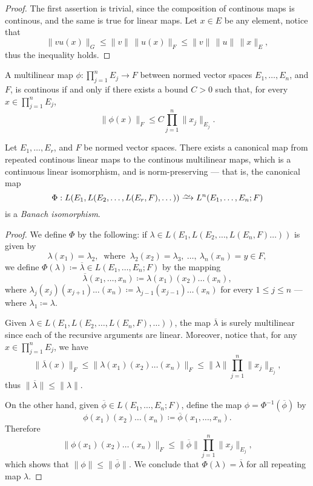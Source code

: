 \begin{proof}
The first assertion is trivial, since the composition of continous maps is
continous, and the same is true for linear maps. Let \(x \in E\) be any element,
notice that
\[
  \|vu(x)\|_G
  \leq \|v\|\, \|u(x)\|_F
  \leq \|v\|\, \|u\|\, \|x\|_{E},
\]
thus the inequality holds.
\end{proof}

\begin{proposition}
\label{prop:multilinear-continous-iff-bounded}
A multilinear map \(\phi: \prod_{j=1}^n E_j \to F\) between normed vector spaces
\(E_1, \dots, E_n\), and \(F\), is continous if and only if there exists a bound
\(C > 0\) such that, for every \(x \in \prod_{j = 1}^n E_j\),
\[
  \|\phi(x)\|_{F} \leq C \prod_{j=1}^n \|x_j\|_{E_j}.
\]
\end{proposition}

\begin{proposition}
\label{prop:canonical-iso-banach-multilinear}
Let \(E_1, \dots, E_r\), and \(F\) be normed vector spaces. There exists a
canonical map from repeated continous linear maps to the continous multilinear
maps, which is a continuous linear isomorphism, and is norm-preserving --- that
is, the canonical map
\[
  \Phi: L(E_1, L(E_2, \dots, L(E_r, F), \dots)) \isoto L^n(E_1, \dots, E_n; F)
\]
is a \emph{Banach isomorphism}.
\end{proposition}

\begin{proof}
We define \(\Phi\) by the following: if \(\lambda \in L(E_1, L(E_2, \dots,
L(E_n, F) \dots))\) is given by
\[
  \lambda(x_1) = \lambda_2,\ \text{ where }\ \lambda_2(x_2) = \lambda_3, \
  \dots, \ \lambda_n(x_n) = y \in F,
\]
we define \(\Phi(\lambda) \coloneq \overline{\lambda} \in L(E_1, \dots, E_n;
F)\) by the mapping
\[
  \overline\lambda(x_1, \dots, x_n) \coloneq \lambda(x_1)(x_2) \dots (x_n),
\]
where \(\lambda_j(x_j)(x_{j+1}) \dots (x_n) \coloneq \lambda_{j-1}(x_{j-1})
\dots (x_n)\) for every \(1 \leq j \leq n\) --- where \(\lambda_1 \coloneq
\lambda\).

Given \(\lambda \in L(E_1, L(E_2, \dots, L(E_n, F), \dots))\), the map
\(\overline\lambda\) is surely multilinear since each of the recursive arguments
are linear. Moreover, notice that, for any \(x \in \prod_{j=1}^n E_j\), we have
\[
  \|\overline\lambda(x)\|_{F}
  \leq \|\lambda(x_1) (x_2) \dots (x_n)\|_F
  \leq \|\lambda\| \prod_{j=1}^n \|x_{j}\|_{E_j},
\]
thus \(\|\overline\lambda\| \leq \|\lambda\|\).

On the other hand, given \(\overline\phi \in L(E_1, \dots, E_n; F)\), define the
map \(\phi = \Phi^{-1}(\overline\phi)\) by
\[
  \phi(x_1)(x_2) \dots (x_n) \coloneq \overline\phi(x_1, \dots, x_n).
\]
Therefore
\[
  \|\phi(x_1)(x_2) \dots (x_n)\|_{F}
  \leq \|\overline\phi\| \prod_{j=1}^n \|x_j\|_{E_j},
\]
which shows that \(\|\phi\| \leq \|\overline\phi\|\). We conclude that
\(\Phi(\lambda) = \overline\lambda\) for all repeating map \(\lambda\).
\end{proof}


